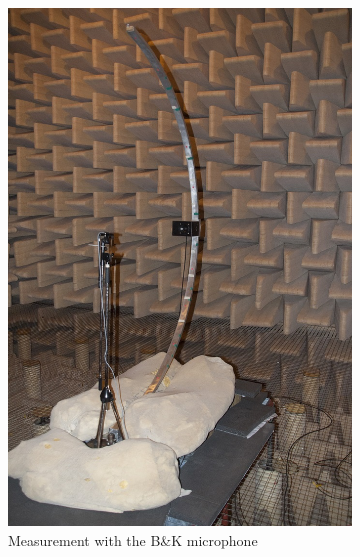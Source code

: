 \begin{figure}[h!]
\begin{subfigure}[b]{0.5\textwidth}
                \centering
    			\includegraphics[height=0.28\textheight]{afbeeldingen/meetmic.jpg}
    			\caption{Measurement with the B\&K microphone}
			    \label{fig:meetmic}
        \end{subfigure}~
        \begin{subfigure}[b]{0.5\textwidth}
			    

\end{subfigure}
\end{figure}
